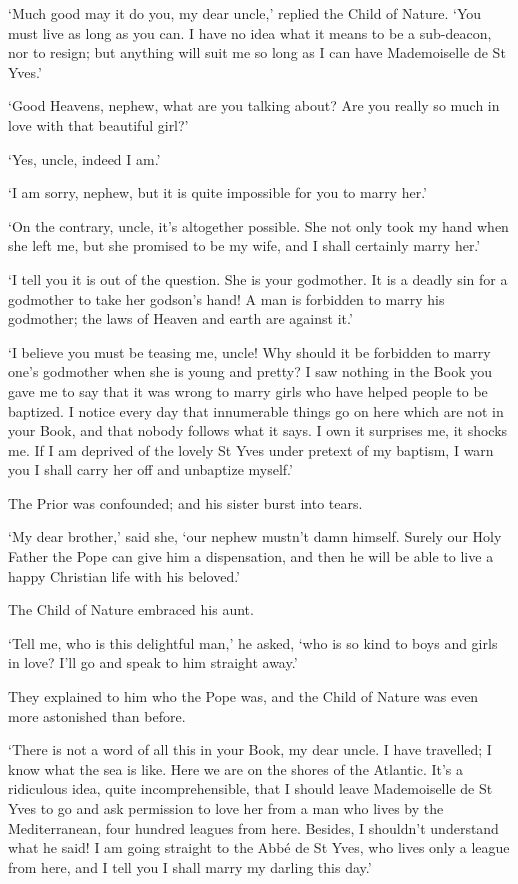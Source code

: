 \documentclass{article}
\begin{document}
\begin{center}
`Much good may it do you, my dear uncle,' replied the Child of Nature. `You must 
live as long as you can. I have no idea what it means to be a sub-deacon, nor to 
resign; but anything will suit me so long as I can have Mademoiselle de St Yves.' 

`Good Heavens, nephew, what are you talking about? Are you really so much in love 
with that beautiful girl?' 

`Yes, uncle, indeed I am.' 

`I am sorry, nephew, but it is quite impossible for you to marry her.' 

`On the contrary, uncle, it's altogether possible. She not only took my hand when 
she left me, but she promised to be my wife, and I shall certainly marry her.' 

`I tell you it is out of the question. She is your godmother. It is a deadly sin 
for a godmother to take her godson's hand! A man is forbidden to marry his godmother; 
the laws of Heaven and earth are against it.' 

`I believe you must be teasing me, uncle! Why should it be forbidden to marry one's 
godmother when she is young and pretty? I saw nothing in the Book you gave me to 
say that it was wrong to marry girls who have helped people to be baptized. I notice 
every day that innumerable things go on here which are not in your Book, and that 
nobody follows what it says. I own it surprises me, it shocks me. If I am deprived 
of the lovely St Yves under pretext of my baptism, I warn you I shall carry her 
off and unbaptize myself.' 

The Prior was confounded; and his sister burst into tears. 

`My dear brother,' said she, `our nephew mustn't damn himself. Surely our Holy 
Father the Pope can give him a dispensation, and then he will be able to live a 
happy Christian life with his beloved.' 

The Child of Nature embraced his aunt. 

`Tell me, who is this delightful man,' he asked, `who is so kind to boys and girls 
in love? I'll go and speak to him straight away.' 

They explained to him who the Pope was, and the Child of Nature was even more astonished 
than before. 

`There is not a word of all this in your Book, my dear uncle. I have travelled; 
I know what the sea is like. Here we are on the shores of the Atlantic. It's a 
ridiculous idea, quite incomprehensible, that I should leave Mademoiselle de St 
Yves to go and ask permission to love her from a man who lives by the Mediterranean, 
four hundred leagues from here. Besides, I shouldn't understand what he said! I 
am going straight to the Abbé de St Yves, who lives only a league from here, and 
I tell you I shall marry my darling this day.' 


\end{center}
\end{document}
